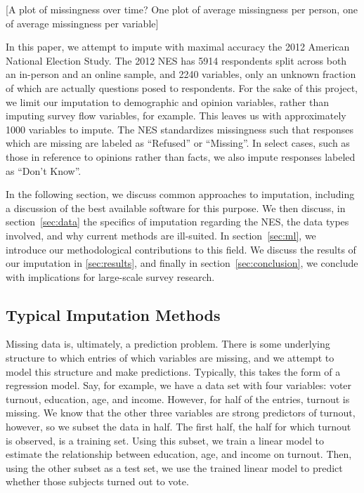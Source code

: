 \documentclass{article}
\begin{document}
[A plot of missingness over time? One plot of average missingness per person, one of average missingness per variable]

In this paper, we attempt to impute with maximal accuracy the 2012 American National Election Study. The 2012 NES has 5914 respondents split across both an in-person and an online sample, and 2240 variables, only an unknown fraction of which are actually questions posed to respondents. For the sake of this project, we limit our imputation to demographic and opinion variables, rather than imputing survey flow variables, for example. This leaves us with approximately 1000 variables to impute. The NES standardizes missingness such that responses which are missing are labeled as ``Refused'' or ``Missing''. In select cases, such as those in reference to opinions rather than facts, we also impute responses labeled as ``Don't Know''. 

 In the following section, we discuss common approaches to imputation, including a discussion of the best available software for this purpose. We then discuss, in section~\autoref{sec:data} the specifics of imputation regarding the NES, the data types involved, and why current methods are ill-suited. In section~\autoref{sec:ml}, we introduce our methodological contributions to this field. We discuss the results of our imputation in \autoref{sec:results}, and finally in section~\autoref{sec:conclusion}, we conclude with implications for large-scale survey research.


\subsection{Typical Imputation Methods}
\label{sec:typical}
Missing data is, ultimately, a prediction problem. There is some underlying structure to which entries of which variables are missing, and we attempt to model this structure and make predictions. Typically, this takes the form of a regression model. Say, for example, we have a data set with four variables: voter turnout, education, age, and income. However, for half of the entries, turnout is missing. We know that the other three variables are strong predictors of turnout, however, so we subset the data in half. The first half, the half for which turnout is observed, is a training set. Using this subset, we train a linear model to estimate the relationship between education, age, and income on turnout. Then, using the other subset as a test set, we use the trained linear model to predict whether those subjects turned out to vote. 
\end{document}

